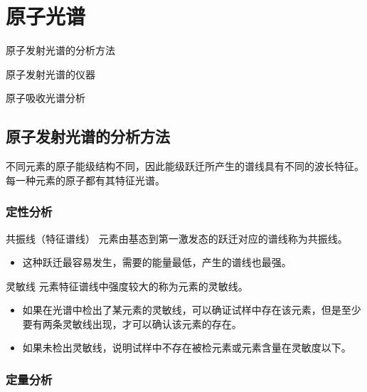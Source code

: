 \chapter{原子光谱}

\begin{introduction}
	\item 原子发射光谱的分析方法
	\item 原子发射光谱的仪器
	\item 原子吸收光谱分析
\end{introduction}



\section{原子发射光谱的分析方法}

不同元素的原子能级结构不同，因此能级跃迁所产生的谱线具有不同的波长特征。每一种元素的原子都有其特征光谱。
\subsection{定性分析}

\begin{definition*}{共振线（特征谱线）}{}
	元素由基态到第一激发态的跃迁对应的谱线称为共振线。
	\begin{itemize}
		\item 这种跃迁最容易发生，需要的能量最低，产生的谱线也最强。
	\end{itemize}
\end{definition*}

\begin{definition*}{灵敏线}{}
	元素特征谱线中强度较大的称为元素的灵敏线。

\begin{itemize}
	\item 如果在光谱中检出了某元素的灵敏线，可以确证试样中存在该元素，但是至少要有两条灵敏线出现，才可以确认该元素的存在。
	\item 如果未检出灵敏线，说明试样中不存在被检元素或元素含量在灵敏度以下。
\end{itemize}
\end{definition*}

\subsection{定量分析}

